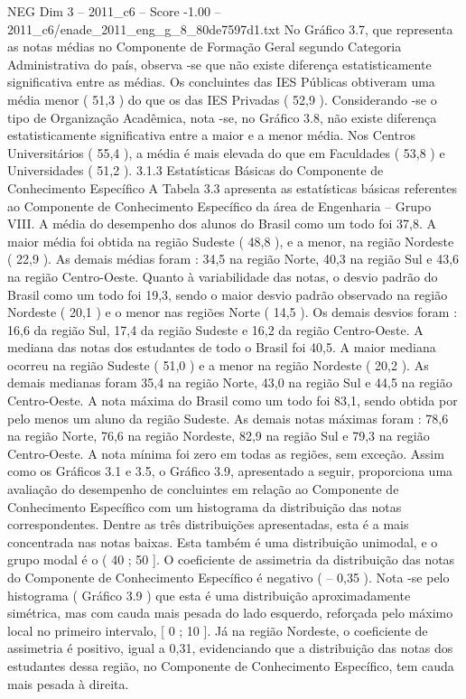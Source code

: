 \begin{textsample}{NEG Dim 3 – 2011\_c6 – Score -1.00 – 2011\_c6/enade\_2011\_eng\_g\_8\_80de7597d1.txt}
No Gráfico 3.7, que representa as notas médias no Componente de Formação Geral segundo Categoria Administrativa do país, observa -se que não existe diferença estatisticamente significativa entre as médias.
Os concluintes das IES Públicas obtiveram uma média menor ( 51,3 ) do que os das IES Privadas ( 52,9 ).
Considerando -se o tipo de Organização Acadêmica, nota -se, no Gráfico 3.8, não existe diferença estatisticamente significativa entre a maior e a menor média.
Nos Centros Universitários ( 55,4 ), a média é mais elevada do que em Faculdades ( 53,8 ) e Universidades ( 51,2 ). 3.1.3 Estatísticas Básicas do Componente de Conhecimento Específico A Tabela 3.3 apresenta as estatísticas básicas referentes ao Componente de Conhecimento Específico da área de Engenharia – Grupo VIII.
A média do desempenho dos alunos do Brasil como um todo foi 37,8.
A maior média foi obtida na região Sudeste ( 48,8 ), e a menor, na região Nordeste ( 22,9 ).
As demais médias foram : 34,5 na região Norte, 40,3 na região Sul e 43,6 na região Centro-Oeste.
Quanto à variabilidade das notas, o desvio padrão do Brasil como um todo foi 19,3, sendo o maior desvio padrão observado na região Nordeste ( 20,1 ) e o menor nas regiões Norte ( 14,5 ).
Os demais desvios foram : 16,6 da região Sul, 17,4 da região Sudeste e 16,2 da região Centro-Oeste.
A mediana das notas dos estudantes de todo o Brasil foi 40,5.
A maior mediana ocorreu na região Sudeste ( 51,0 ) e a menor na região Nordeste ( 20,2 ).
As demais medianas foram 35,4 na região Norte, 43,0 na região Sul e 44,5 na região Centro-Oeste.
A nota máxima do Brasil como um todo foi 83,1, sendo obtida por pelo menos um aluno da região Sudeste.
As demais notas máximas foram : 78,6 na região Norte, 76,6 na região Nordeste, 82,9 na região Sul e 79,3 na região Centro-Oeste.
A nota mínima foi zero em todas as regiões, sem exceção.
Assim como os Gráficos 3.1 e 3.5, o Gráfico 3.9, apresentado a seguir, proporciona uma avaliação do desempenho de concluintes em relação ao Componente de Conhecimento Específico com um histograma da distribuição das notas correspondentes.
Dentre as três distribuições apresentadas, esta é a mais concentrada nas notas baixas.
Esta também é uma distribuição unimodal, e o grupo modal é o ( 40 ; 50 ].
O coeficiente de assimetria da distribuição das notas do Componente de Conhecimento Específico é negativo ( – 0,35 ).
Nota -se pelo histograma ( Gráfico 3.9 ) que esta é uma distribuição aproximadamente simétrica, mas com cauda mais pesada do lado esquerdo, reforçada pelo máximo local no primeiro intervalo, [ 0 ; 10 ].
Já na região Nordeste, o coeficiente de assimetria é positivo, igual a 0,31, evidenciando que a distribuição das notas dos estudantes dessa região, no Componente de Conhecimento Específico, tem cauda mais pesada à direita.

\end{textsample}
